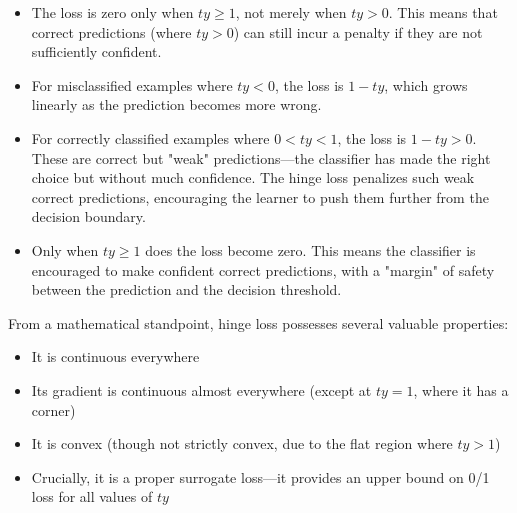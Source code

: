 \begin{itemize} 
\item The loss is zero only when $ty \geq 1$, not merely when $ty > 0$. This means that correct predictions (where $ty > 0$) can still incur a penalty if they are not sufficiently confident.

\item For misclassified examples where $ty < 0$, the loss is $1 - ty$, which grows linearly as the prediction becomes more wrong.

\item For correctly classified examples where $0 < ty < 1$, the loss is $1 - ty > 0$. These are correct but "weak" predictions—the classifier has made the right choice but without much confidence. The hinge loss penalizes such weak correct predictions, encouraging the learner to push them further from the decision boundary.

\item Only when $ty \geq 1$ does the loss become zero. This means the classifier is encouraged to make confident correct predictions, with a "margin" of safety between the prediction and the decision threshold.
\end{itemize}

From a mathematical standpoint, hinge loss possesses several valuable properties:
\begin{itemize}
\item It is continuous everywhere
\item Its gradient is continuous almost everywhere (except at $ty = 1$, where it has a corner)
\item It is convex (though not strictly convex, due to the flat region where $ty > 1$)
\item Crucially, it is a proper surrogate loss—it provides an upper bound on 0/1 loss for all values of $ty$
\end{itemize}

\begin{center}
\end{center}

